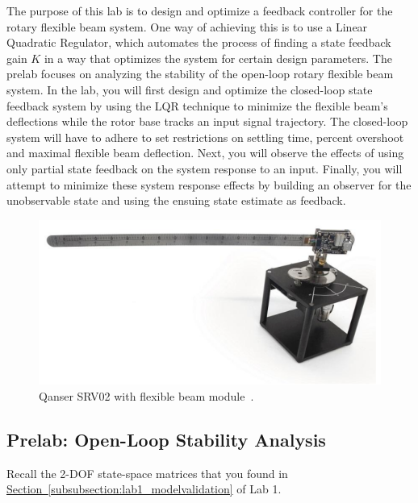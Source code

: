 \documentclass[12pt]{report}
\begin{document}
The purpose of this lab is to design and optimize a feedback controller for the rotary flexible beam system. One way of achieving this is to use a Linear Quadratic Regulator, which automates the process of finding a state feedback gain $K$ in a way that optimizes the system for certain design parameters. The prelab focuses on analyzing the stability of the open-loop rotary flexible beam system. In the lab, you will first design and optimize the closed-loop state feedback system by using the LQR technique to minimize the flexible beam's deflections while the rotor base tracks an input signal trajectory. The closed-loop system will have to adhere to set restrictions on settling time, percent overshoot and maximal flexible beam deflection. Next, you will observe the effects of using only partial state feedback on the system response to an input. Finally, you will attempt to minimize these system response effects by building an observer for the unobservable state and using the ensuing state estimate as feedback.
\begin{figure}[htb!]
    \centering
    \includegraphics[width=.6\linewidth]{eps/lab_1/quanser.eps}
    \caption{Qanser SRV02 with flexible beam module~\cite{Q-Flex-Beam}.}
    \label{fig:lab4_plant}
\end{figure}

\subsection{Prelab: Open-Loop Stability Analysis}\label{subsection:lab4_prelab}
Recall the 2-DOF state-space matrices that you found in \hyperref[subsubsection:lab1_modelvalidation]{Section~\ref{subsubsection:lab1_modelvalidation}} of Lab 1.
\end{document}
